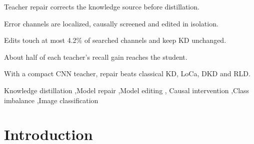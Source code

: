 \documentclass[review,number,sort&compress]{elsarticle}
\theoremstyle{definition}
\begin{document}
\begin{frontmatter}
\begin{highlights}
\item Teacher repair corrects the knowledge source before distillation.
\item Error channels are localized, causally screened and edited in isolation.
\item Edits touch at most 4.2\% of searched channels and keep KD unchanged.
\item About half of each teacher's recall gain reaches the student.
\item With a compact CNN teacher, repair beats classical KD, LoCa, DKD and RLD.
\end{highlights}

\begin{keyword}
Knowledge distillation \sep Model repair \sep Model editing \sep
Causal intervention \sep Class imbalance \sep Image classification
\end{keyword}

\end{frontmatter}

\linenumbers

\section{Introduction}
\label{sec:introduction}
\end{document}
